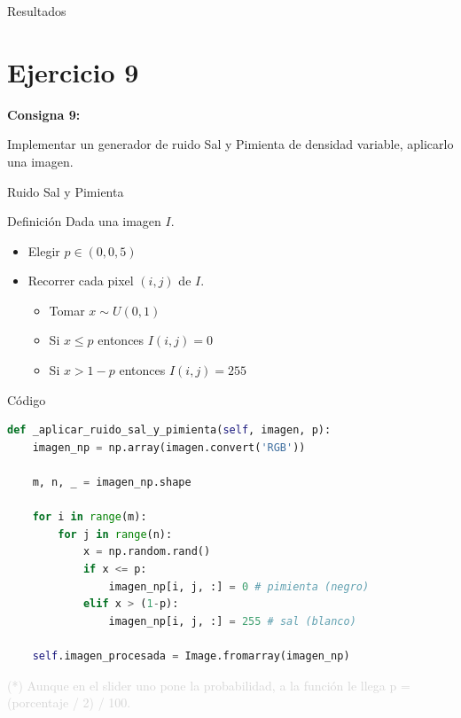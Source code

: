 \documentclass{beamer}
\begin{document}
\begin{frame}[fragile]{Resultados}
\begin{minipage}{0.45\linewidth}
		\label{fig:lenaej8c}
	\end{minipage}
\end{frame}

\section{Ejercicio 9}

\begin{frame}
	\begin{center}
		\textcolor{unahurverde}{\textbf{Consigna 9:}}
	\end{center}
	\justifying
	
	Implementar un generador de ruido Sal y Pimienta de densidad variable, aplicarlo una
	imagen.
\end{frame}

\begin{frame}[fragile]{Ruido Sal y Pimienta}
	\justifying
	
	\begin{block}{Definición}
		Dada una imagen $I$.
		\begin{itemize}
			\item Elegir $p \in (0, 0,5)$
			\item Recorrer cada pixel $(i, j)$ de $I$.
			\begin{itemize}
				\item Tomar $x \sim U(0,1)$
				\item Si $x \leq p$ entonces $I(i,j) = 0$
				\item Si $x > 1 - p$ entonces $I(i,j) = 255$
			\end{itemize}
		\end{itemize}
	\end{block}
\end{frame}

\begin{frame}[fragile]{Código}
	\justifying
	
	\begin{lstlisting}[language=Python]
def _aplicar_ruido_sal_y_pimienta(self, imagen, p):
	imagen_np = np.array(imagen.convert('RGB'))
	
	m, n, _ = imagen_np.shape
	
	for i in range(m):
		for j in range(n):
			x = np.random.rand()
			if x <= p:
				imagen_np[i, j, :] = 0 # pimienta (negro)
			elif x > (1-p):
				imagen_np[i, j, :] = 255 # sal (blanco)
	
	self.imagen_procesada = Image.fromarray(imagen_np)
	\end{lstlisting}
	
	\vfill
	\footnotesize \textcolor{lightgray}{(*) Aunque en el slider uno pone la probabilidad, a la función le llega p = (porcentaje / 2) / 100.}
\end{frame}
\end{document}

